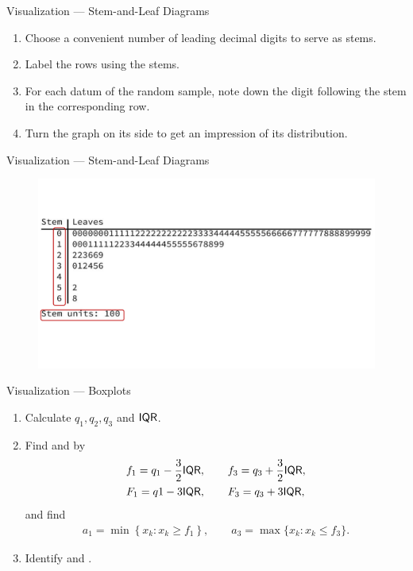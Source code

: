 \begin{frame}{Visualization --- Stem-and-Leaf Diagrams}

\begin{enumerate}
	\justifying
	\item Choose a convenient number of leading decimal digits to serve as stems.
	\item Label the rows using the stems.
	\item For each datum of the random sample, note down the digit following the stem in the corresponding row.
	\item Turn the graph on its side to get an impression of its distribution.
\end{enumerate}

\end{frame}

\begin{frame}{Visualization --- Stem-and-Leaf Diagrams}

\begin{figure}[htbp]
	\centering
	\includegraphics[width=\linewidth]{./images/rc4fig1.pdf}
\end{figure}

\end{frame}


\begin{frame}{Visualization --- Boxplots}

\begin{enumerate}
	\justifying
	\item Calculate $q_1, q_2, q_3$ and $\mathsf{IQR}$.
	\item Find  and  by
	\begin{align*}
	& f_1 = q_1 - \frac{3}{2}\mathsf{IQR}, \qquad f_3 = q_3 + \frac{3}{2}\mathsf{IQR}, \\
	& F_1 = q1 - 3\mathsf{IQR}, \qquad F_3 = q_3 + 3\mathsf{IQR},
	\end{align*}
	and find 
	\begin{align*}
	a_1 = \min\left\{x_k: x_k\geq f_1 \right\}, \qquad a_3 = \max\{x_k: x_k\leq f_3 \}.
	\end{align*}
	\item Identify  and .
\end{enumerate}

\end{frame}


